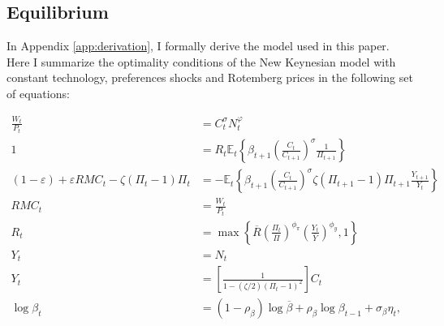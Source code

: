 \documentclass[12pt]{article}
\numberwithin{equation}{section}
\begin{document}
\subsection{Equilibrium}\label{sec:model_equilibrium}

In Appendix \ref{app:derivation}, I formally derive the model used in this paper. Here I summarize the optimality conditions of the New Keynesian model with constant technology, preferences shocks and Rotemberg prices in the following set of equations:

\begin{align}
	\frac{W_t}{P_t}&=C_t^{\sigma}N_t^{\varphi}\label{eq:m_intra}\\
	1&=R_t\mathbb{E}_t\left\{\beta_{t+1}\left(\frac{C_t}{C_{t+1}}\right)^{\sigma}\frac{1}{\Pi_{t+1}}\right\}\label{eq:m_euler}\\
	(1-\varepsilon)+\varepsilon RMC_t-\zeta(\Pi_t-1)\Pi_t&=-\mathbb{E}_t\left\{\beta_{t+1}\left(\frac{C_t}{C_{t+1}}\right)^{\sigma}\zeta(\Pi_{t+1}-1)\Pi_{t+1}\frac{Y_{t+1}}{Y_t}\right\}\label{eq:m_pricing}\\
	RMC_t&=\frac{W_t}{P_t}\label{eq:m_rmc}\\
	R_t&=\max\left\{\overline R\left(\frac{\Pi_t}{\overline\Pi}\right)^{\phi_{\pi}}\left(\frac{Y_t}{\overline{Y}}\right)^{\phi_{y}},1\right\}\label{eq:m_taylor}\\
	Y_t&=N_t\label{eq:m_product}\\
	Y_t&=\left[\frac{1}{1-(\zeta/2)(\Pi_t-1)^2}\right]C_t\label{eq:m_aggregate}\\
	\log \beta_t&=(1-\rho_{\beta})\log\overline\beta+\rho_{\beta}\log \beta_{t-1}+\sigma_{\beta}\eta_t,\label{eq:m_ar1_b}
\end{align}
\end{document}
